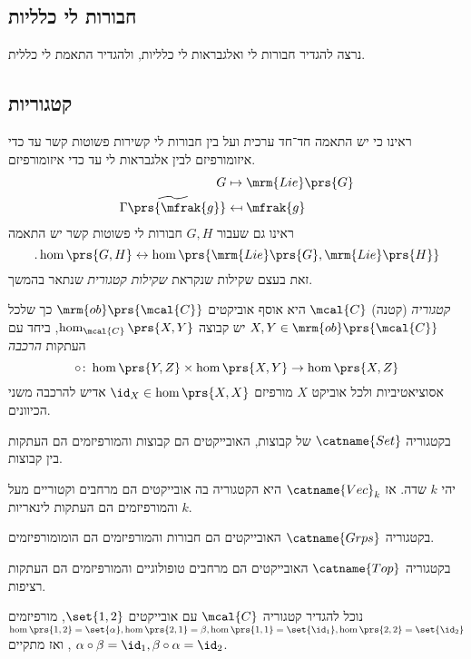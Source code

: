 \documentclass[10pt, twoside]{book}
\newcommand{\Lie}{\mrm{Lie}}
\begin{document}
\subsection{חבורות לי כלליות}

נרצה להגדיר חבורות לי ואלגבראות לי כלליות, ולהגדיר התאמת לי כללית.

\subsection{קטגוריות}
ראינו כי יש התאמה חד־חד ערכית ועל בין חבורות לי קשירות פשוטות קשר עד כדי איזומורפיזם לבין אלגבראות לי עד כדי איזומורפיזם.
\begin{align*}
G &\mapsto \Lie\prs{G} \\
\widetilde{\Gamma\prs{\mfrak{g}}} &\mapsfrom \mfrak{g}
\end{align*}
ראינו גם שעבור
$G,H$
חבורות לי פשוטות קשר יש התאמה
\[\text{.} \hom\prs{G,H} \leftrightarrow \hom\prs{\Lie\prs{G}, \Lie\prs{H}}\]
זאת בעצם שקילות שנקראת
\emph{שקילות קטגורית}
שנתאר בהמשך.

\begin{definition}[קטגוריה]
\emph{קטגוריה}
(קטנה)
$\mcal{C}$
היא אוסף אוביקטים
$\mrm{ob}\prs{\mcal{C}}$
כך שלכל
$X,Y \in \mrm{ob}\prs{\mcal{C}}$
יש קבוצה
$\hom_{\mcal{C}}\prs{X,Y}$,
ביחד עם העתקות
\emph{הרכבה}
\[\circ \colon \hom\prs{Y,Z} \times \hom\prs{X,Y} \to \hom\prs{X,Z}\]
אסוציאטיביות ולכל אוביקט
$X$
מורפיזם
$\id_X \in \hom\prs{X,X}$
אדיש להרכבה משני הכיוונים.
\end{definition}

\begin{example}
בקטגוריה
$\catname{Set}$
של קבוצות, האובייקטים הם קבוצות והמורפיזמים הם העתקות בין קבוצות.
\end{example}

\begin{example}
יהי
$k$
שדה.
אז
$\catname{Vec}_k$
היא הקטגוריה בה אובייקטים הם מרחבים וקטוריים מעל
$k$
והמורפיזמים הם העתקות לינאריות.
\end{example}

\begin{example}
בקטגוריה
$\catname{Grps}$
האובייקטים הם חבורות והמורפיזמים הם הומומורפיזמים.
\end{example}

\begin{example}
בקטגוריה
$\catname{Top}$
האובייקטים הם מרחבים טופולוגיים והמורפיזמים הם העתקות רציפות.
\end{example}

\begin{example}
נוכל להגדיר קטגוריה
$\mcal{C}$
עם אובייקטים
$\set{1,2}$,
מורפיזמים
$\hom\prs{1,2} = \set{\alpha}, \hom\prs{2,1} = \beta, \hom\prs{1,1} = \set{\id_1}, \hom\prs{2,2} = \set{\id_2}$,
ואז מתקיים
$\alpha \circ \beta = \id_1, \beta \circ \alpha = \id_2$.
\end{example}
\end{document}
